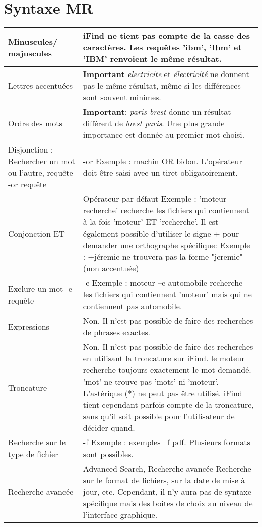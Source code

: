 \section{Syntaxe MR}

\begin{center}
\begin{tabular}{| p{5cm} | p{8cm} |}
\hline
Minuscules/ majuscules & iFind ne tient pas compte de la casse des caractères.
Les requêtes 'ibm', 'Ibm' et 'IBM' renvoient le même résultat.\\
\hline
Lettres accentuées & \textbf{Important} \textit{electricite} et \textit{électricité}
ne donnent pas le même résultat, même si les différences sont souvent minimes.\\
\hline
Ordre des mots & \textbf{Important}: \textit{paris brest} donne un résultat 
différent de \textit{brest paris}. Une plus grande importance est donnée au premier 
mot choisi.\\
\hline
 Disjonction : Rechercher un mot ou  l'autre, requête -or requête
&
-or
Exemple : machin OR bidon. L'opérateur doit être saisi avec un tiret obligatoirement.\\
\hline
 Conjonction
 ET
& Opérateur par défaut
Exemple : 'moteur recherche' recherche les fichiers qui contiennent à la fois 'moteur' ET 'recherche'. 
Il est également possible d'utiliser le signe + pour demander une orthographe spécifique:
Exemple : +jéremie ne trouvera pas la forme "jeremie" (non accentuée)\\
\hline
 Exclure un mot
-e requête
&-e
Exemple : moteur –e automobile recherche les fichiers qui contiennent 'moteur' mais qui ne contiennent pas automobile.\\
\hline
 Expressions & Non. Il n'est pas possible de faire des recherches de phrases exactes.\\
\hline
Troncature & Non. Il n'est pas possible de faire des recherches en utilisant la troncature sur iFind. 
le moteur recherche toujours exactement le mot demandé. 'mot' ne trouve pas 'mots' ni 'moteur'. L'astérique (*) ne peut pas être utilisé. 
iFind tient cependant parfois compte de la troncature, sans qu'il soit possible pour l'utilisateur de décider quand.\\
\hline
 Recherche sur le type de fichier
& -f
Exemple : exemples –f pdf. Plusieurs formats sont possibles.\\
\hline
 Recherche avancée & 
Advanced Search, Recherche avancée
Recherche sur le format de fichiers, sur la date de mise à jour, etc. Cependant, il n’y aura pas de syntaxe spécifique mais des boites de choix au niveau de l’interface graphique.\\
\hline

\end{tabular}
 
\end{center}

